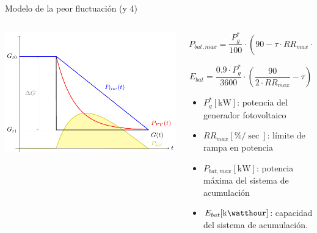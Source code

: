 \documentclass[aspectratio=169, usenames,svgnames,dvipsnames]{beamer}
\begin{document}
\begin{frame}[label={sec:org4cff633}]{Modelo de la peor fluctuación (y 4)}
\begin{columns}
\begin{column}{0.4\columnwidth}
\begin{center}
\includegraphics[width=\textwidth]{../figs/ModeloPeorFluctuacion.pdf}
\end{center}
\end{column}

\begin{column}{0.6\columnwidth}
\[
  P_{bat,max} = \frac{P_g^*}{100} \cdot \left(90 - \tau \cdot RR_{max} \cdot \left( 1 + \ln\frac{90}{\tau \cdot RR_{max}}\right) \right)
\]

\[
  E_{bat} = \frac{0.9 \cdot P_g^*}{3600} \cdot \left( \frac{90}{2 \cdot RR_{max}} - \tau \right)
\]

\begin{itemize}
\item \(P_g^* [\unit{\kilo\watt}]\): potencia del generador fotovoltaico
\item \(RR_{max} [\unit{\%\per\sec}]\): límite de rampa en potencia
\item \(P_{bat,max} [\unit{\kilo\watt}]\): potencia máxima del sistema de acumulación
\item \(E_{bat} [\unit{\kilo\watthour}]\): capacidad del sistema de acumulación.
\end{itemize}
\end{column}
\end{columns}
\end{frame}
\end{document}
